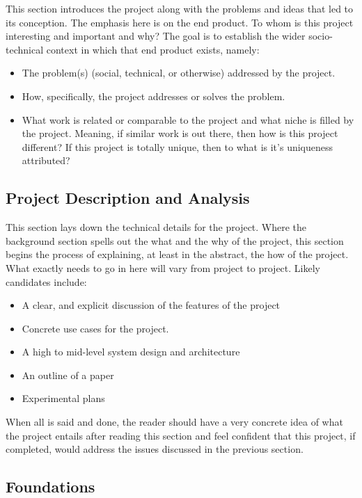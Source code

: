 \documentclass[10pt]{article}
\begin{document}
This section introduces the project along with the problems and ideas that led to its conception.  The emphasis here is on the end product.  To whom is this project interesting and important and why? The goal is to establish the wider socio-technical context in which that end product exists, namely:
\begin{itemize}
\item The problem(s) (social, technical, or otherwise) addressed by the project.
\item How, specifically, the project addresses or solves the problem.
\item What work is related or comparable to the project and what niche is filled by the project. Meaning, if similar work is out there, then how is this project different?  If this project is totally unique, then to what is it's uniqueness attributed? 
\end{itemize}


\subsection{Project Description and Analysis}


This section lays down the technical details for the project. Where the background section spells out the what and the why of the project, this section begins the process of explaining, at least in the abstract, the how of the project. What exactly needs to go in here will vary from project to project.  Likely candidates include:  
\begin{itemize}
\item A clear, and explicit discussion of the features of the project
\item Concrete use cases for the project. 
\item A high to mid-level system design and architecture
\item An outline of a paper 
\item Experimental plans 
\end{itemize}
When all is said and done, the reader should have a very concrete idea of what the project entails after reading this section and feel confident that this project, if completed, would address the issues discussed in the previous section.

\subsection{Foundations}
\end{document}
